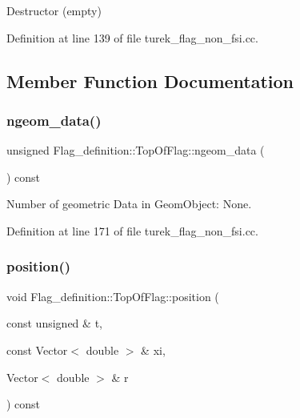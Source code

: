 Destructor (empty) 



Definition at line 139 of file turek\+\_\+flag\+\_\+non\+\_\+fsi.\+cc.



\subsection{Member Function Documentation}
\mbox{\label{classFlag__definition_1_1TopOfFlag_a1ca5543c07da97885e955acd241616ec}} 
\subsubsection{\texorpdfstring{ngeom\+\_\+data()}{ngeom\_data()}}
{\footnotesize\ttfamily unsigned Flag\+\_\+definition\+::\+Top\+Of\+Flag\+::ngeom\+\_\+data (\begin{DoxyParamCaption}{ }\end{DoxyParamCaption}) const\hspace{0.3cm}{\ttfamily [inline]}}



Number of geometric Data in Geom\+Object\+: None. 



Definition at line 171 of file turek\+\_\+flag\+\_\+non\+\_\+fsi.\+cc.

\mbox{\label{classFlag__definition_1_1TopOfFlag_a99adccd501bc69e0af51918d77e0f1b7}} 
\subsubsection{\texorpdfstring{position()}{position()}\hspace{0.1cm}{\footnotesize\ttfamily [1/2]}}
{\footnotesize\ttfamily void Flag\+\_\+definition\+::\+Top\+Of\+Flag\+::position (\begin{DoxyParamCaption}\item[{const unsigned \&}]{t,  }\item[{const Vector$<$ double $>$ \&}]{xi,  }\item[{Vector$<$ double $>$ \&}]{r }\end{DoxyParamCaption}) const\hspace{0.3cm}{\ttfamily [inline]}}



